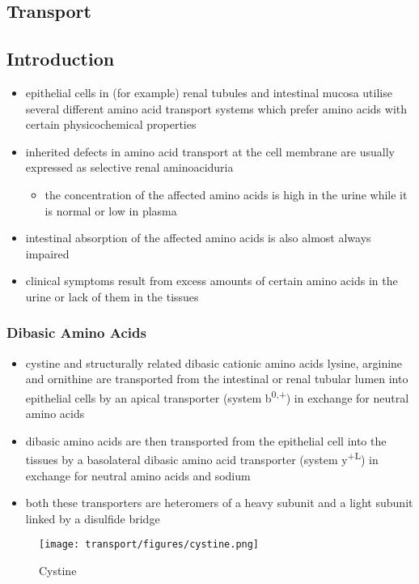 \documentclass[12pt]{scrartcl}
\begin{document}
\begin{center}
\begin{center}
\section{Transport}
\label{sec:org9cc8d1a}
\subsection{Introduction}
\label{sec:org2e3a444}
\begin{itemize}
\item epithelial cells in (for example) renal tubules and intestinal
mucosa utilise several different amino acid transport systems which
prefer amino acids with certain physicochemical properties
\item inherited defects in amino acid transport at the cell membrane are
usually expressed as selective renal aminoaciduria
\begin{itemize}
\item the concentration of the affected amino acids is high in the urine
while it is normal or low in plasma
\end{itemize}
\item intestinal absorption of the affected amino acids is also almost
always impaired
\item clinical symptoms result from excess amounts of certain amino acids
in the urine or lack of them in the tissues
\end{itemize}
\subsubsection{Dibasic Amino Acids}
\label{sec:org681acf7}
\begin{itemize}
\item cystine and structurally related dibasic cationic amino acids
lysine, arginine and ornithine are transported from the intestinal
or renal tubular lumen into epithelial cells by an apical
transporter (system b\textsuperscript{0,+}) in exchange for neutral amino acids
\item dibasic amino acids are then transported from the epithelial cell
into the tissues by a basolateral dibasic amino acid transporter
(system y\textsuperscript{+L}) in exchange for neutral amino acids and sodium
\item both these transporters are heteromers of a heavy subunit and a
light subunit linked by a disulfide bridge
\end{itemize}

\begin{figure}[htbp]
\centering
\texttt{[image: transport/figures/cystine.png]}
\caption{\label{fig:orgf6b2cf3}Cystine}
\end{figure}


\end{center}
\end{center}
\end{document}
